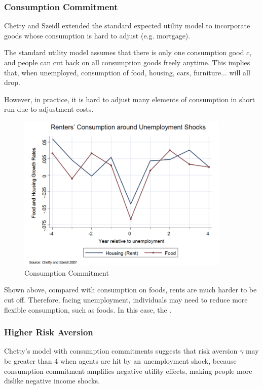         \subsubsection{Consumption Commitment}
        Chetty and Szeidl extended the standard expected utility model to incorporate goods whose consumption is hard to adjust (e.g. mortgage).
        
        The standard utility model assumes that there is only one consumption good $c$, and people can cut back on all consumption goods freely anytime. This implies that, when unemployed, consumption of food, housing, cars, furniture... will all drop.
        
        However, in practice, it is hard to adjust many elements of consumption in short run due to adjustment costs.
        \begin{figure}[H]
            \centering
            \includegraphics[width=4in]{images/ch1/Chetty_1.png}
            \caption{Consumption Commitment}
            \label{fig:Chetty}
        \end{figure}
        Shown above, compared with consumption on foods, rents are much harder to be cut off. Therefore, facing unemployment, individuals may need to reduce more flexible consumption, such as foods. In this case, the .
        \subsubsection{Higher Risk Aversion}
        Chetty's model with consumption commitments suggests that risk aversion $\gamma$ may be greater than 4 when agents are hit by an unemployment shock, because consumption commitment amplifies negative utility effects, making people more dislike negative income shocks.
        
